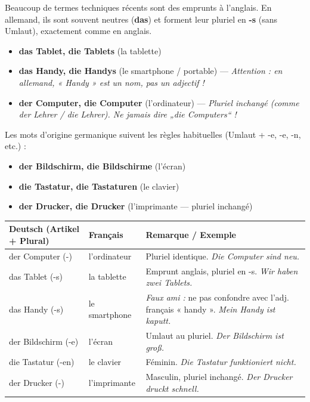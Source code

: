 \documentclass[11pt]{article}
\newcommand{\all}[1]{\ifmmode\text{\textit{#1}}\else\begingroup\selectlanguage{ngerman}\itshape #1\endgroup\fi}
\begin{document}
\begin{propriete}
Beaucoup de termes techniques récents sont des emprunts à l'anglais. En allemand, ils sont souvent neutres (\textbf{das}) et forment leur pluriel en \textbf{-s} (sans Umlaut), exactement comme en anglais.
\begin{itemize}
    \item \textbf{das Tablet, die Tablets} (la tablette)
    \item \textbf{das Handy, die Handys} (le smartphone / portable) — \emph{Attention : en allemand, « Handy » est un nom, pas un adjectif !}
    \item \textbf{der Computer, die Computer} (l'ordinateur) — \emph{Pluriel inchangé (comme der Lehrer / die Lehrer). Ne jamais dire „die Computers“ !}
\end{itemize}
Les mots d'origine germanique suivent les règles habituelles (Umlaut + -e, -e, -n, etc.) :
\begin{itemize}
    \item \textbf{der Bildschirm, die Bildschirme} (l'écran)
    \item \textbf{die Tastatur, die Tastaturen} (le clavier)
    \item \textbf{der Drucker, die Drucker} (l'imprimante — pluriel inchangé)
\end{itemize}
\end{propriete}

\begin{center}
\begin{tabularx}{\linewidth}{|X|X|X|}
\hline
\rowcolor{popblueL} \textbf{Deutsch (Artikel + Plural)} & \textbf{Français} & \textbf{Remarque / Exemple} \\
\hline
der Computer (-) & l'ordinateur & Pluriel identique. \all{Die Computer sind neu.} \\
das Tablet (-s) & la tablette & Emprunt anglais, pluriel en -s. \all{Wir haben zwei Tablets.} \\
das Handy (-s) & le smartphone & \emph{Faux ami :} ne pas confondre avec l'adj. français « handy ». \all{Mein Handy ist kaputt.} \\
der Bildschirm (-e) & l'écran & Umlaut au pluriel. \all{Der Bildschirm ist groß.} \\
die Tastatur (-en) & le clavier & Féminin. \all{Die Tastatur funktioniert nicht.} \\
der Drucker (-) & l'imprimante & Masculin, pluriel inchangé. \all{Der Drucker druckt schnell.} \\
\hline
\end{tabularx}
\end{center}
\end{document}
